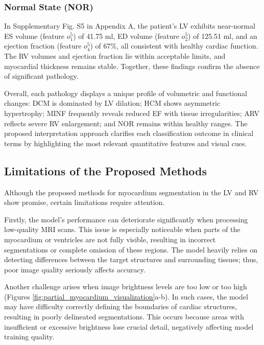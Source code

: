 \documentclass[fleqn,10pt]{wlscirep}
\begin{document}
\subsubsection*{Normal State (NOR)}

In Supplementary Fig. S5 in Appendix A, the patient’s LV exhibits near-normal ES volume (feature \(o_1^5\)) of 41.75 ml, ED volume (feature \(o_2^5\)) of 125.51 ml, and an ejection fraction (feature \(o_4^5\)) of 67\%, all consistent with healthy cardiac function. The RV volumes and ejection fraction lie within acceptable limits, and myocardial thickness remains stable. Together, these findings confirm the absence of significant pathology.

Overall, each pathology displays a unique profile of volumetric and functional changes: DCM is dominated by LV dilation; HCM shows asymmetric hypertrophy; MINF frequently reveals reduced EF with tissue irregularities; ARV reflects severe RV enlargement; and NOR remains within healthy ranges. The proposed interpretation approach clarifies each classification outcome in clinical terms by highlighting the most relevant quantitative features and visual cues.

\subsection*{Limitations of the Proposed Methods}

Although the proposed methods for myocardium segmentation in the LV and RV show promise, certain limitations require attention.

Firstly, the model’s performance can deteriorate significantly when processing low-quality MRI scans. This issue is especially noticeable when parts of the myocardium or ventricles are not fully visible, resulting in incorrect segmentations or complete omission of these regions. The model heavily relies on detecting differences between the target structures and surrounding tissues; thus, poor image quality seriously affects accuracy.

Another challenge arises when image brightness levels are too low or too high (Figures \ref{fig:partial_myocardium_visualization}a-b). In such cases, the model may have difficulty correctly defining the boundaries of cardiac structures, resulting in poorly delineated segmentations. This occurs because areas with insufficient or excessive brightness lose crucial detail, negatively affecting model training quality.
\end{document}
